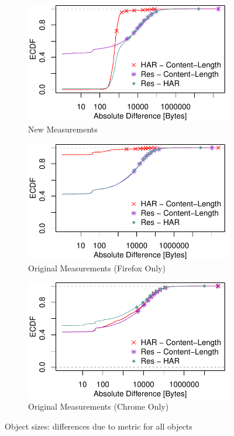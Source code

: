 \begin{figure}[ht!]
		\centering
\begin{subfigure}{\linewidth}
		\includegraphics[width=\linewidth]{New_Plots/ecdf_diff_objectsizes.pdf}
	\caption{New Measurements}
	\label{fig:new_absolute_byte_index}
\end{subfigure}\par\medskip
 \begin{subfigure}{\linewidth}
		\centering
		\includegraphics[width=\linewidth]{Firefox Plots/ecdf_diff_objectsizes.pdf}
	\caption{Original Measurements (Firefox Only)}
	\label{fig:orig_absolute_byte_index}
\end{subfigure}
 \begin{subfigure}{\linewidth}
		\includegraphics[width=\linewidth]{Chrome_Plots/ecdf_diff_objectsizes.pdf}
	\caption{Original Measurements (Chrome Only)}
	\label{fig:orig_chrome_absolute_byte_index}
\end{subfigure}
\caption{Object sizes: differences due to metric for all objects}
	\label{fig:absolute_byte_index}
\end{figure}